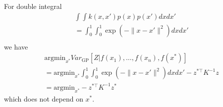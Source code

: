 For double integral
\begin{align}
    & \int \int k(x,x')p(x)p(x')dxdx' \\
    & = \int_0^1 \int_0^1 \exp(-\|x - x'\|^2) dx dx' \\
\label{eq:double-integral}
\end{align}
we have
\begin{align}
    & \mbox{argmin}_{x^*} Var_{\mbox{GP}}\left[Z | f(x_1), \ldots, f(x_n), f(x^*) \right]  \\
    & = \mbox{argmin}_{x^*}  \int_0^1 \int_0^1 \exp(-\|x - x'\|^2) dx dx' - z^{*\top}K^{-1}z \\
 & = \mbox{argmin}_{x^*}  - z^{*\top}K^{-1}z^*
\end{align}
which does not depend on $x^*$.